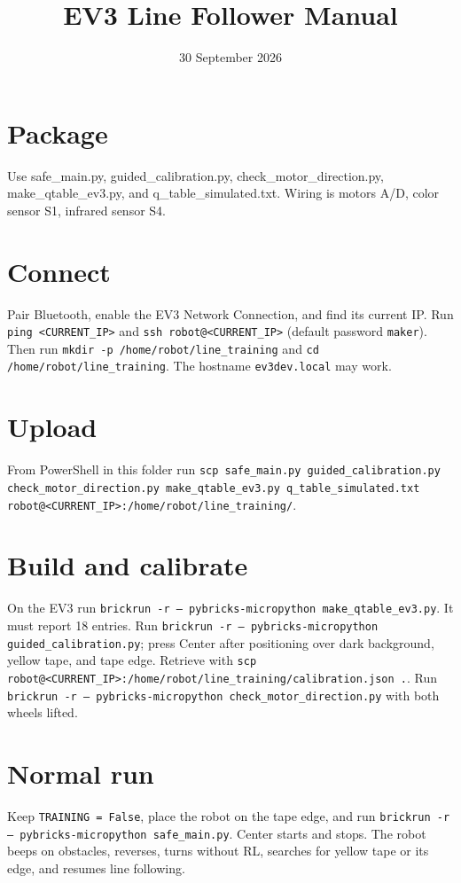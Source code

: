 \documentclass{article}
\title{EV3 Line Follower Manual}
\date{30 September 2026}
\begin{document}
\maketitle
\section*{Package}
Use safe\_main.py, guided\_calibration.py, check\_motor\_direction.py, make\_qtable\_ev3.py, and q\_table\_simulated.txt. Wiring is motors A/D, color sensor S1, infrared sensor S4.
\section*{Connect}
Pair Bluetooth, enable the EV3 Network Connection, and find its current IP. Run \texttt{ping <CURRENT\_IP>} and \texttt{ssh robot@<CURRENT\_IP>} (default password \texttt{maker}). Then run \texttt{mkdir -p /home/robot/line\_training} and \texttt{cd /home/robot/line\_training}. The hostname \texttt{ev3dev.local} may work.
\section*{Upload}
From PowerShell in this folder run \texttt{scp safe\_main.py guided\_calibration.py check\_motor\_direction.py make\_qtable\_ev3.py q\_table\_simulated.txt robot@<CURRENT\_IP>:/home/robot/line\_training/}.
\section*{Build and calibrate}
On the EV3 run \texttt{brickrun -r -- pybricks-micropython make\_qtable\_ev3.py}. It must report 18 entries. Run \texttt{brickrun -r -- pybricks-micropython guided\_calibration.py}; press Center after positioning over dark background, yellow tape, and tape edge. Retrieve with \texttt{scp robot@<CURRENT\_IP>:/home/robot/line\_training/calibration.json .}. Run \texttt{brickrun -r -- pybricks-micropython check\_motor\_direction.py} with both wheels lifted.
\section*{Normal run}
Keep \texttt{TRAINING = False}, place the robot on the tape edge, and run \texttt{brickrun -r -- pybricks-micropython safe\_main.py}. Center starts and stops. The robot beeps on obstacles, reverses, turns without RL, searches for yellow tape or its edge, and resumes line following.
\end{document}
